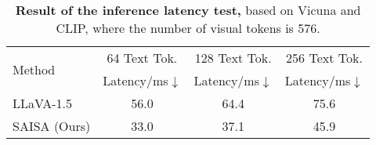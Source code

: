 \begin{table}[t]
  \centering
    \scalebox{0.8}
    {
    \begin{tabular}{l|ccc}
    \toprule
    \multirow{2}[2]{*}{Method}  &  64 Text Tok.  & 128 Text Tok.  & 256 Text Tok.   \\
         &  Latency/ms$\downarrow$     &  Latency/ms$\downarrow$           & Latency/ms$\downarrow$  \\
    \midrule
    LLaVA-1.5  & 56.0    & 64.4  & 75.6   \\
    \rowcolor{cyan!20} SAISA (Ours)  & 33.0  & 37.1  & 45.9   \\
    \bottomrule
    \end{tabular}
    }
    \caption{\textbf{Result of the inference latency test,} based on Vicuna and CLIP, where the number of visual tokens is 576. 
    }
  \label{tab:latency}
\end{table}
